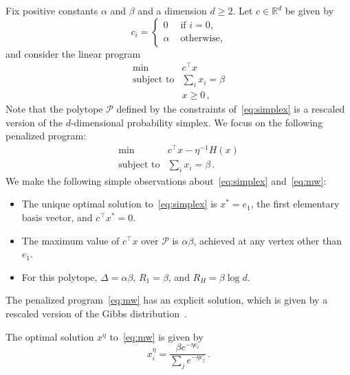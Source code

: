 \documentclass[final,12pt]{colt2018}
\newcommand{\cP}{\mathcal{P}}
\newcommand{\RR}{\mathbb{R}}
\newcommand{\1}{\mathds{1}}
\newcommand*{\ent}[1]{H(#1)}
\begin{document}
Fix positive constants $\alpha$ and $\beta$ and a dimension $d \geq 2$.
Let $c \in \RR^d$ be given by
\begin{equation*}
c_i = \left\{\begin{array}{ll}
0 & \text{ if $i = 0$,} \\
\alpha & \text{ otherwise,}
\end{array}\right.
\end{equation*}
and consider the linear program
\begin{equation}\label{eq:simplex}
\begin{array}{rl}
\min & c^\top x  \\
\text{subject to}& \sum_i x_i  = \beta \\
& x  \geq 0\,,
\end{array}
\end{equation}
Note that the polytope $\cP$ defined by the constraints of~\eqref{eq:simplex} is a rescaled version of the $d$-dimensional probability simplex.
We focus on the following penalized program:
\begin{equation}\label{eq:mw}
\begin{array}{rl}
\min & c^\top x - \eta^{-1} \ent{x} \\
\text{subject to}& \sum_i x_i  = \beta\,.
\end{array}
\end{equation}
We make the following simple observations about~\eqref{eq:simplex} and~\eqref{eq:mw}:
\begin{itemize}
\item The unique optimal solution to~\eqref{eq:simplex} is $x^* = e_1$, the first elementary basis vector, and $c^\top x^* = 0$.
\item The maximum value of $c^\top x$ over $\cP$ is $\alpha \beta$, achieved at any vertex other than $e_1$.
\item For this polytope, $\Delta = \alpha \beta$, $R_1 = \beta$, and $R_H = \beta \log d$.
\end{itemize}

The penalized program~\eqref{eq:mw} has an explicit solution, which is given by a rescaled version of the Gibbs distribution~\citep{MezMon09}.
\begin{proposition}\label{prop:mw_explicit}
The optimal solution $x^\eta$ to~\eqref{eq:mw} is given by
\begin{equation*}
x^\eta_i = \frac{\beta e^{- \eta c_i}}{\sum_j e^{-\eta c_j}}\,.
\end{equation*}
\end{proposition}
\end{document}
